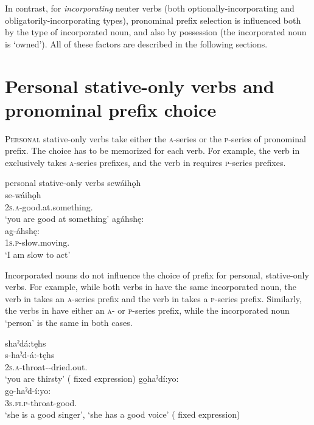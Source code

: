 In contrast, for \emph{incorporating} neuter verbs (both optionally-incorporating  and obligatorily-incorporating  types), pronominal prefix selection is influenced both by the type of incorporated noun, and also by possession (the incorporated noun is ‘owned’). All of these factors are described in the following sections.


\section{Personal stative-only verbs and pronominal prefix choice} \label{Personal stative-only verbs and pronominal prefix choice}
\textsc{Personal} stative-only verbs take either the \textsc{a}-series or the \textsc{p}-series of pronominal prefix. The choice has to be memorized for each verb. For example, the verb in  exclusively takes \textsc{a}-series prefixes, and the verb in  requires \textsc{p}-series prefixes.  

\ea\label{ex:adjvbppchoicex13} personal stative-only verbs
\ea\label{ex:adjvbppchoicex13a} sewáihǫh\\
\gll se-wáihǫh\\
 \textsc{2s.a}-good.at.something.{\stative}\\
\glt `you are good at something'
\ex agáhshę:\\\label{ex:adjvbppchoicex13b}
\gll ag-áhshę:\\
 \textsc{1s.p}-slow.moving.{\stative}\\
\glt `I am slow to act'
\z
\z

Incorporated nouns do not influence the choice of prefix for personal, stative-only verbs. For example, while both verbs in  have the same incorporated noun, the verb in  takes an \textsc{a}-series prefix and the verb in  takes a \textsc{p}-series prefix. Similarly, the verbs in  have either an \textsc{a}- or \textsc{p}-series prefix, while the incorporated noun  ‘person’ is the same in both cases.

\ea\label{ex:adjvbppchoicex14} 
\ea shaˀdá:tęhs\\\label{ex:adjvbppchoicex14a}
\gll s-haˀd-á:-tęhs\\
 \textsc{2s.a}-throat-{\joinerA}-dried.out. {\habitual} \\
\glt `you are thirsty' ( fixed expression)
\ex go̱haˀdí:yo: \\\label{ex:adjvbppchoicex14b}
\gll go̱-haˀd-í:yo:\\
 \textsc{3s.fi.p}-throat-good.{\stative} \\
\glt ‘she is a good singer’, `she has a good voice' ( fixed expression)
\z
\z

